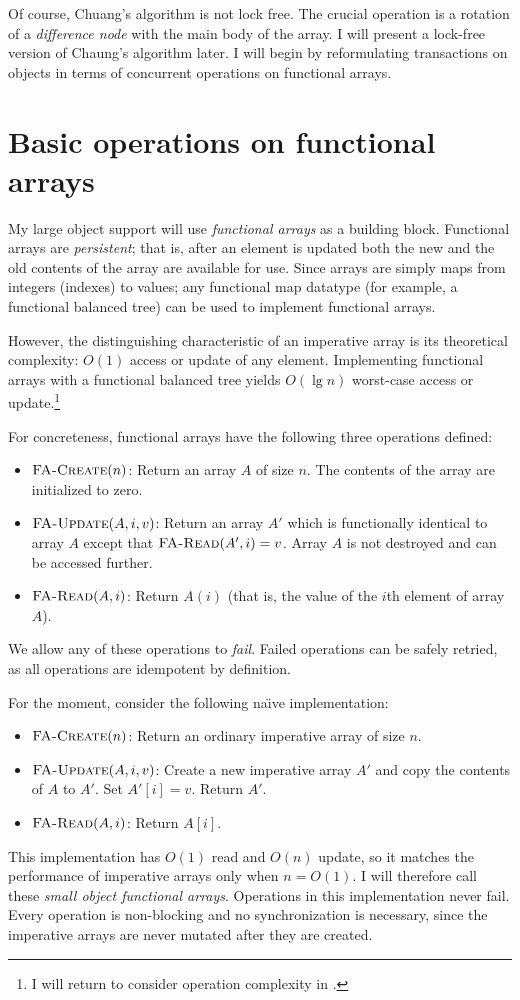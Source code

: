 Of course, Chuang's algorithm is not lock free.
The crucial operation is a rotation of a \emph{difference node} with the
main body of the array.  I will present a lock-free version of
Chaung's algorithm later.  I will begin by
reformulating transactions on objects in terms of concurrent
operations on functional arrays.

\section{Basic operations on functional arrays}
My large object support will use \emph{functional arrays} as
a building block.  Functional arrays are \emph{persistent}; that is,
after an element is updated both the new and the old contents of the
array are available for use.  Since arrays are simply maps from
integers (indexes) to values; any functional map datatype (for
example, a functional balanced tree) can be used to implement
functional arrays.

However, the distinguishing characteristic of an imperative array is its
theoretical complexity: $O(1)$ access or update of any element.
Implementing functional arrays with a functional balanced tree yields
$O(\lg n)$ worst-case access or update.\footnote{I will return to
consider operation complexity in .}

For concreteness, functional arrays have the following three
operations defined:
\begin{itemize}
\item $\text{\sc FA-Create}(n)$: Return an array $A$ of size $n$.  The
  contents of the array are initialized to zero.
\item $\text{\sc FA-Update}(A, i, v)$: Return an array $A'$ which is
  functionally identical to array $A$ except that
  $\text{\sc FA-Read}(A', i)=v$.
  Array $A$ is not destroyed and can be accessed further.
\item $\text{\sc FA-Read}(A, i)$: Return $A(i)$ (that is, the
  value of the $i$th element of array $A$).
\end{itemize}
We allow any of these operations to \emph{fail}.  Failed operations
can be safely retried, as all operations are idempotent by definition.

For the moment, consider the following na{\"\i}ve implementation:
\begin{itemize}
\item $\text{\sc FA-Create}(n)$: Return an ordinary imperative array of size
  $n$.
\item $\text{\sc FA-Update}(A, i, v)$: Create a new imperative array
  $A'$ and copy the contents of $A$ to $A'$.  Set $A'[i]=v$. Return $A'$.
\item $\text{\sc FA-Read}(A, i)$: Return $A[i]$.
\end{itemize}
This implementation has $O(1)$ read and $O(n)$ update, so it matches
the performance of imperative arrays only when $n=O(1)$.  I will
therefore call these \emph{small object functional arrays}.  Operations
in this implementation never fail.  Every operation is non-blocking
and no synchronization is necessary, since the imperative arrays are
never mutated after they are created.

